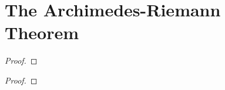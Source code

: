 \documentclass[letterpaper, twoside, 12pt]{book}
\begin{document}
\section{The Archimedes-Riemann Theorem}


\begin{lemma}[6.7]

\end{lemma}
\begin{proof}

\end{proof}


\begin{theorem}[6.8]

\end{theorem}
\begin{proof}

\end{proof}




\end{document}
